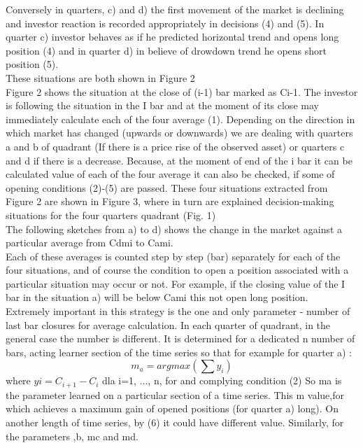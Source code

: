 \documentclass{tewiart}
\begin{document}
Conversely in quarters, c) and d) the first movement of the market is declining and investor reaction is recorded appropriately in decisions (4) and (5). In quarter c) investor behaves as if he predicted horizontal trend and opens long position (4) and in quarter d) in believe of drowdown trend he opens short position (5). \\
These situations are both shown in Figure 2\\
\indent Figure 2 shows the situation at the close of (i-1) bar marked as Ci-1. The investor is following the situation in the I bar and at the moment of its close may immediately calculate each of the four average (1). Depending on the direction in which market has changed (upwards or downwards) we are dealing with quarters a and b of quadrant (If there is a price rise of the observed asset) or quarters c and d if there is a decrease.
Because, at the moment of end of the i bar it can be calculated  value of each of the four average it can also be checked, if some of opening conditions (2)-(5) are passed. These four situations extracted from Figure 2 are shown in Figure 3, where in turn are explained  decision-making situations for the four quarters quadrant (Fig. 1)\\
\indent The following sketches from a) to d) shows the change in the market against a particular average from Cdmi to Cami.\\
\indent Each of these averages is counted step by step (bar) separately for each of the four situations, and of course the condition to open a position associated with a particular situation may occur or not. For example, if the closing value of the I bar in the situation a) will be below Cami this not open long position.\\
\indent Extremely important in this strategy is the one and only parameter - number of last bar closures for average calculation. In each quarter of quadrant, in the general case the number is different. It is determined for a dedicated n number of bars, acting learner section of the time series so that for example for quarter a) :\\
\begin{equation}
	m_a = argmax (\sum y_i  )
\end{equation}
where
$yi = C_{i+1} - C_{i}$ dla i=1, ..., n, for and complying  condition (2)
So ma is the parameter learned on a particular section of a time series. This m  value,for which achieves a maximum gain of opened positions (for quarter a) long). On another length of time series, by (6) it could have different value. Similarly, for the parameters ,b, mc and md.\\
\end{document}
